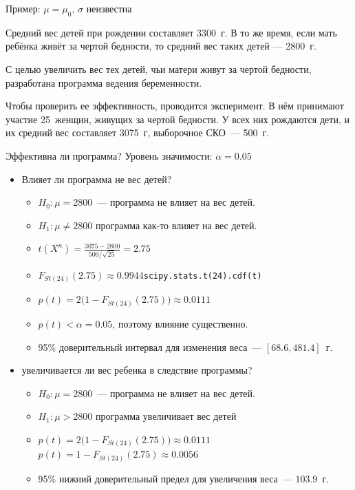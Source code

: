 \documentclass[11pt,pdf,utf8,hyperref={unicode},aspectratio=169]{beamer}
\begin{document}
\begin{frame}[allowframebreaks]{Пример:  $\mu=\mu_0$, $\sigma$ неизвестна}
    \begin{block}{}
        Средний вес детей при рождении составляет 3300~г. В то же время, если мать ребёнка живёт за чертой бедности, то средний вес таких детей — 2800~г.

        С целью увеличить вес тех детей, чьи матери живут за чертой бедности, разработана программа ведения беременности.

        Чтобы проверить ее эффективность, проводится эксперимент. В нём принимают участие 25~женщин, живущих за чертой бедности. У всех них рождаются дети, и их средний вес составляет 3075~г, выборочное СКО~--- 500~г.

        Эффективна ли программа? Уровень значимости: $\alpha = 0.05$
     \end{block}
    \framebreak
    \begin{itemize}
        \item {} Влияет ли программа не вес детей?
        \begin{itemize}
            \item $H_0\colon \mu=2800$~--- программа не влияет на вес детей.
            \item $H_1\colon \mu \neq 2800$ программа как-то влияет на вес детей.
            \item $t(X^n) = \frac{3075-2800}{500/\sqrt{25}} = 2.75$
            \item $F_{St(24)}(2.75) \approx 0.9944$\hfill \alert{\texttt{scipy.stats.t(24).cdf(t)}}
            \item $p(t) = 2\big(1-F_{St(24)}(2.75)\big)\approx 0.0111$
            \item $p(t)< \alpha=0.05$, поэтому влияние существенно.
            \item 95\% доверительный интервал для изменения веса~--- $\left[68.6, 481.4\right]$~г.
       \end{itemize}
       \medskip
        \item {} увеличивается ли вес ребенка в следствие программы?
        \begin{itemize}
            \item $H_0\colon \mu=2800$~--- программа не влияет на вес детей.
            \item $H_1\colon \mu>2800 $ программа увеличивает вес детей
            \item $p(t) = 2\big(1-F_{St(24)}(2.75)\big)\approx 0.0111$
             $p(t) = 1- F_{St(24)}(2.75) \approx 0.0056$
             \item 95\% нижний доверительный предел для увеличения веса~--- $103.9$~г.
        \end{itemize}
    \end{itemize}
\end{frame}
\end{document}
